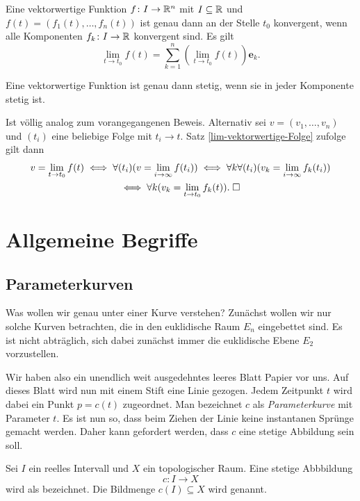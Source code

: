 \begin{theorem}\label{lim-vektorwertige-Funktion}
Eine vektorwertige Funktion $f\colon I\to\mathbb R^n$ mit $I\subseteq\mathbb R$ und
$f(t)=(f_1(t),\ldots,f_n(t))$ ist genau dann an der Stelle $t_0$
konvergent, wenn alle Komponenten $f_k\colon I\to\mathbb R$
konvergent sind. Es gilt%
\begin{equation}
\lim_{t\to t_0} f(t) = \sum_{k=1}^n (\lim_{t\to t_0}f(t))\mathbf e_k.
\end{equation}
\end{theorem}
\begin{corollary}
Eine vektorwertige Funktion ist genau dann stetig, wenn sie in
jeder Komponente stetig ist.
\end{corollary}
 Ist völlig analog zum vorangegangenen Beweis.
Alternativ sei $v=(v_1,\ldots,v_n)$ und $(t_i)$ eine beliebige Folge
mit $t_i\to t$. Satz \ref{lim-vektorwertige-Folge} zufolge gilt dann
\begin{gather}
v = \lim_{t\to t_0} f(t) \iff \forall (t_i)(v=\lim_{i\to\infty} f(t_i))
\iff \forall k\forall(t_i)(v_k = \lim_{i\to\infty} f_k(t_i))\\
\iff \forall k(v_k = \lim_{t\to t_0} f_k(t)).\;\Box
\end{gather}


\section{Allgemeine Begriffe}
\subsection{Parameterkurven}

Was wollen wir genau unter einer Kurve verstehen? Zunächst wollen
wir nur solche Kurven betrachten, die in den euklidische Raum $E_n$
eingebettet sind. Es ist nicht abträglich, sich dabei zunächst immer
die euklidische Ebene $E_2$ vorzustellen.

Wir haben also ein unendlich weit ausgedehntes leeres Blatt Papier
vor uns. Auf dieses Blatt wird nun mit einem Stift eine Linie gezogen.
Jedem Zeitpunkt $t$ wird dabei ein Punkt $p=c(t)$ zugeordnet.
Man bezeichnet $c$ als \emph{Parameterkurve} mit Parameter $t$.
Es ist nun so, dass beim Ziehen der Linie keine instantanen Sprünge
gemacht werden. Daher kann gefordert werden, dass $c$ eine
stetige Abbildung sein soll.

\begin{definition}
Sei $I$ ein reelles Intervall und $X$ ein topologischer Raum.
Eine stetige Abbbildung%
\begin{equation}
c\colon I\to X
\end{equation}
wird als  bezeichnet. Die Bildmenge
$c(I)\subseteq X$ wird  genannt.
\end{definition}

